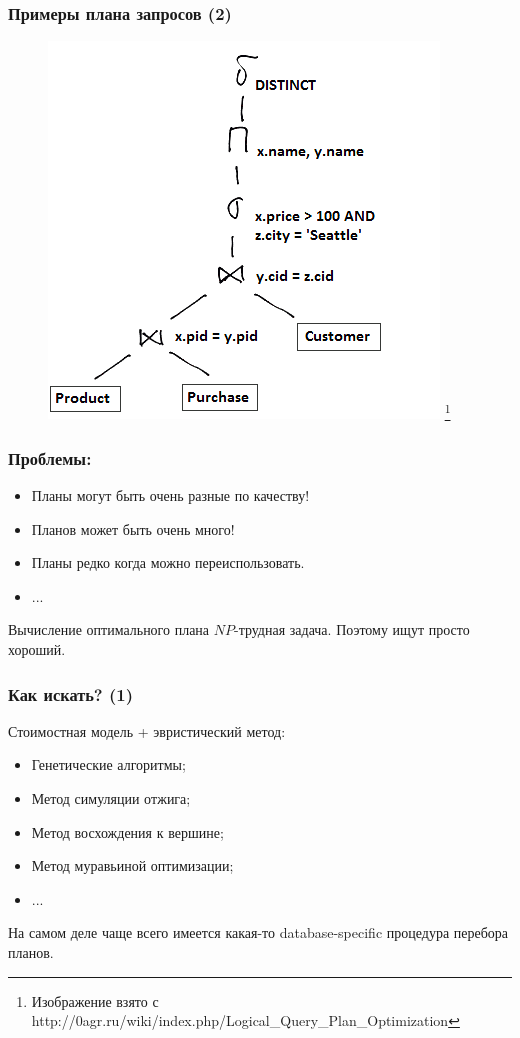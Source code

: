 \documentclass{beamer}
\begin{document}
\begin{frame}
\frametitle{Примеры плана запросов (2)}
\begin{figure}[htb]
\includegraphics[width=\textwidth,height=0.75\textheight,keepaspectratio]{query-plan2.png} \footnote{\tiny{Изображение взято с http://0agr.ru/wiki/index.php/Logical\_Query\_Plan\_Optimization}}
\end{figure}
\end{frame}

\begin{frame}
\frametitle{Проблемы:}
\begin{itemize}
  \setlength\itemsep{1em}
  \item Планы могут быть очень разные по качеству!
  \item Планов может быть очень много!  
  \item Планы редко когда можно переиспользовать.
  \item ...
\end{itemize}
Вычисление оптимального плана $NP$-трудная задача. Поэтому ищут просто хороший.
\end{frame}

\begin{frame}
\frametitle{Как искать? (1)}

Стоимостная модель + эвристический метод:
\begin{itemize}
  \setlength\itemsep{1em}
  \item Генетические алгоритмы;
  \item Метод симуляции отжига;
  \item Метод восхождения к вершине;
  \item Метод муравьиной оптимизации;
  \item ...
\end{itemize}
На самом деле чаще всего имеется какая-то database-specific процедура перебора планов.
\end{frame}
\end{document}
